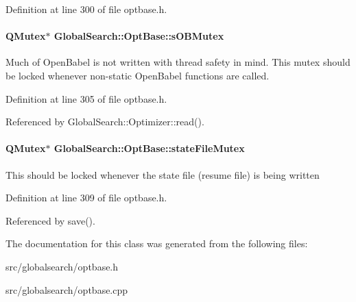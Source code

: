 Definition at line 300 of file optbase.\+h.

\hypertarget{classGlobalSearch_1_1OptBase_a86c1868458b6f8430dc366c009c9deb5}{}
\paragraph[{s\+O\+B\+Mutex}]{\setlength{\rightskip}{0pt plus 5cm}Q\+Mutex$\ast$ Global\+Search\+::\+Opt\+Base\+::s\+O\+B\+Mutex}\label{classGlobalSearch_1_1OptBase_a86c1868458b6f8430dc366c009c9deb5}
Much of Open\+Babel is not written with thread safety in mind. This mutex should be locked whenever non-\/static Open\+Babel functions are called. 

Definition at line 305 of file optbase.\+h.



Referenced by Global\+Search\+::\+Optimizer\+::read().

\hypertarget{classGlobalSearch_1_1OptBase_af0df28a179c8a89022f4887c18761956}{}
\paragraph[{state\+File\+Mutex}]{\setlength{\rightskip}{0pt plus 5cm}Q\+Mutex$\ast$ Global\+Search\+::\+Opt\+Base\+::state\+File\+Mutex}\label{classGlobalSearch_1_1OptBase_af0df28a179c8a89022f4887c18761956}
This should be locked whenever the state file (resume file) is being written 

Definition at line 309 of file optbase.\+h.



Referenced by save().



The documentation for this class was generated from the following files\+:\begin{DoxyCompactItemize}
\item 
src/globalsearch/optbase.\+h\item 
src/globalsearch/optbase.\+cpp\end{DoxyCompactItemize}
